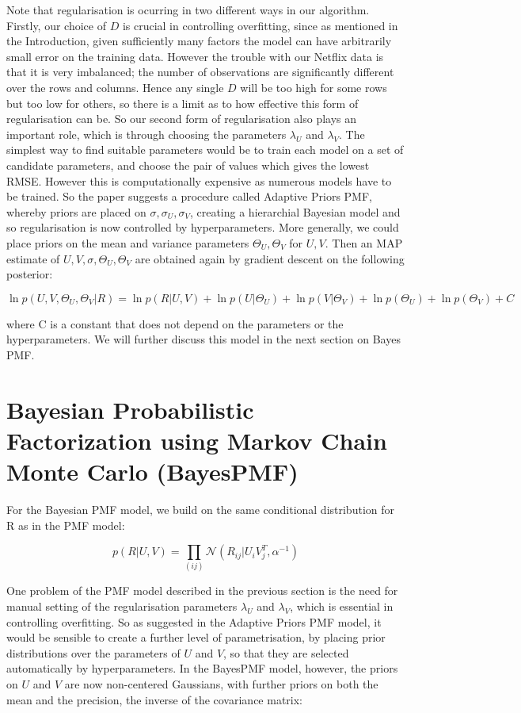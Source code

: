 \documentclass{article}
\theoremstyle{plain}
\begin{document}
Note that regularisation is ocurring in two different ways in our algorithm. Firstly, our choice of $D$ is crucial in controlling overfitting, since as mentioned in the Introduction, given sufficiently many factors the model can have arbitrarily small error on the training data. However the trouble with our Netflix data is that it is very imbalanced; the number of observations are significantly different over the rows and columns. Hence any single $D$ will be too high for some rows but too low for others, so there is a limit as to how effective this form of regularisation can be. So our second form of regularisation also plays an important role, which is through choosing the parameters $\lambda_U$ and $\lambda_V$. The simplest way to find suitable parameters would be to train each model on a set of candidate parameters, and choose the pair of values which gives the lowest RMSE. However this is computationally expensive as numerous models have to be trained. So the paper suggests a procedure called Adaptive Priors PMF, whereby priors are placed on $\sigma,\sigma_U,\sigma_V$, creating a hierarchial Bayesian model and so regularisation is now controlled by hyperparameters. More generally, we could place priors on the mean and variance parameters $\Theta_U, \Theta_V$ for $U,V$. Then an MAP estimate of $U,V,\sigma,\Theta_U,\Theta_V$ are obtained again by gradient descent on the following posterior:

\begin{equation}
\ln p(U,V,\Theta_U,\Theta_V|R)=\ln p(R|U,V)+\ln p(U|\Theta_U)+\ln p(V|\Theta_V)+\ln p(\Theta_U) +\ln p(\Theta_V) + C
\end{equation}

where C is a constant that does not depend on the parameters or the hyperparameters. We will further discuss this model in the next section on Bayes PMF. 


\section{Bayesian Probabilistic Factorization using Markov Chain Monte Carlo (BayesPMF)}

For the Bayesian PMF model, we build on the same conditional distribution for R as in the PMF model:

\begin{equation}
p(R|U,V)=\prod_{(ij)}\mathcal{N}(R_{ij}|U_i V_j^T,\alpha^{-1})
\end{equation}

One problem of the PMF model described in the previous section is the need for manual setting of the regularisation parameters $\lambda_U$ and $\lambda_V$, which is essential in controlling overfitting. So as suggested in the Adaptive Priors PMF model, it would be sensible to create a further level of parametrisation, by placing prior distributions over the parameters of $U$ and $V$, so that they are selected automatically by hyperparameters. In the BayesPMF model, however, the priors on $U$ and $V$ are now non-centered Gaussians, with further priors on both the mean and the precision, the inverse of the covariance matrix:
\end{document}
